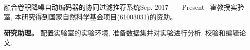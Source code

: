\documentclass{sorahjy_cv}
\begin{document}
\begin{sectionContentNormal}{融合卷积降噪自动编码器的协同过滤推荐系统}{Sep. 2017 - \ \ Present \ }{霍教授实验室, 本研究得到国家自然科学基金项目(61003031)的资助。 }
	\item \textbf{研究助理。} 配置实验室的实验环境, 准备数据集并对实验进行分析. 校验和编辑论文.
\end{sectionContentNormal}

%
%



%
%






\end{document}
